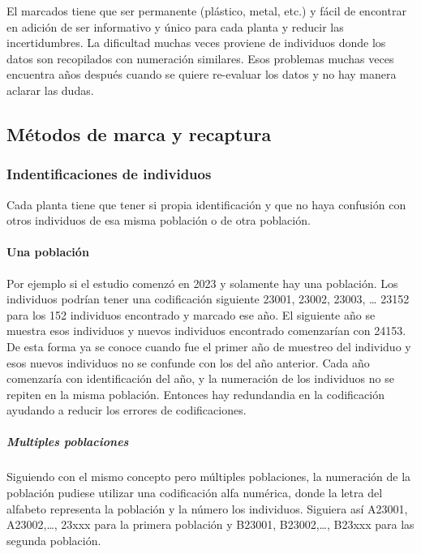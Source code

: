 \documentclass[
]{book}
\theoremstyle{definition}
\theoremstyle{definition}
\theoremstyle{definition}
\theoremstyle{definition}
\theoremstyle{remark}
\begin{document}
El marcados tiene que ser permanente (plástico, metal, etc.) y fácil de encontrar en adición de ser informativo y único para cada planta y reducir las incertidumbres. La dificultad muchas veces proviene de individuos donde los datos son recopilados con numeración similares. Esos problemas muchas veces encuentra años después cuando se quiere re-evaluar los datos y no hay manera aclarar las dudas.

\hypertarget{muxe9todos-de-marca-y-recaptura}{%
\subsection{Métodos de marca y recaptura}\label{muxe9todos-de-marca-y-recaptura}}

\hypertarget{indentificaciones-de-individuos}{%
\subsubsection{Indentificaciones de individuos}\label{indentificaciones-de-individuos}}

Cada planta tiene que tener si propia identificación y que no haya confusión con otros individuos de esa misma población o de otra población.

\hypertarget{una-poblaciuxf3n}{%
\paragraph{Una población}\label{una-poblaciuxf3n}}

Por ejemplo si el estudio comenzó en 2023 y solamente hay una población. Los individuos podrían tener una codificación siguiente 23001, 23002, 23003, \ldots{} 23152 para los 152 individuos encontrado y marcado ese año. El siguiente año se muestra esos individuos y nuevos individuos encontrado comenzarían con 24153. De esta forma ya se conoce cuando fue el primer año de muestreo del individuo y esos nuevos individuos no se confunde con los del año anterior. Cada año comenzaría con identificación del año, y la numeración de los individuos no se repiten en la misma población. Entonces hay redundandia en la codificación ayudando a reducir los errores de codificaciones.

\hypertarget{multiples-poblaciones}{%
\subparagraph{Multiples poblaciones}\label{multiples-poblaciones}}

Siguiendo con el mismo concepto pero múltiples poblaciones, la numeración de la población pudiese utilizar una codificación alfa numérica, donde la letra del alfabeto representa la población y la número los individuos. Siguiera así A23001, A23002,\ldots, 23xxx para la primera población y B23001, B23002,\ldots, B23xxx para las segunda población.
\end{document}
